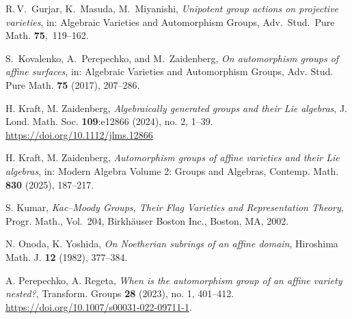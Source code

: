 \documentclass[12pt,a4paper]{amsart}
\theoremstyle{plain}
\theoremstyle{definition}
\theoremstyle{remark}
\begin{document}
\begin{thebibliography}{}
   
   

    R.\,V.~Gurjar, K.~Masuda, M.~Miyanishi, 
      \emph{Unipotent group actions on projective varieties}, 
      in: Algebraic Varieties and Automorphism Groups, 
      Adv.\ Stud.\ Pure Math. \textbf{75},~119--162.
   
   
    S.~Kovalenko, A.~Perepechko, and M.~Zaidenberg,
   \emph{On automorphism groups of affine surfaces}, in: Algebraic Varieties and Automorphism Groups, Adv. Stud. Pure Math. \textbf{75} (2017), 207--286. 
   
    H. Kraft, M. Zaidenberg, \emph{Algebraically generated groups and their Lie algebras}, J. Lond. Math. Soc. \textbf{109}:e12866 (2024), no. 2, 1--39. \url{https://doi.org/10.1112/jlms.12866}
   
    H. Kraft, M. Zaidenberg, \emph{Automorphism groups of affine varieties and their Lie algebras}, in: Modern Algebra Volume 2: Groups and Algebras,
   Contemp. Math. \textbf{830} (2025), 187--217.
   
    S. Kumar, \emph{Kac--Moody Groups, Their Flag Varieties and Representation Theory},
      Progr. Math., Vol.\ 204, Birkh\"auser Boston Inc., Boston, MA, 2002.
   

    N. Onoda, K. Yoshida, \emph{On Noetherian subrings of an affine domain}, Hiroshima Math. J. \textbf{12} (1982), 377--384.
   
       A. Perepechko, A. Regeta, \emph{When is the automorphism group of an affine variety nested?},
      Transform. Groups \textbf{28} (2023), no. 1, 401--412. \url{https://doi.org/10.1007/s00031-022-09711-1}.
   

\end{thebibliography}
\end{document}
